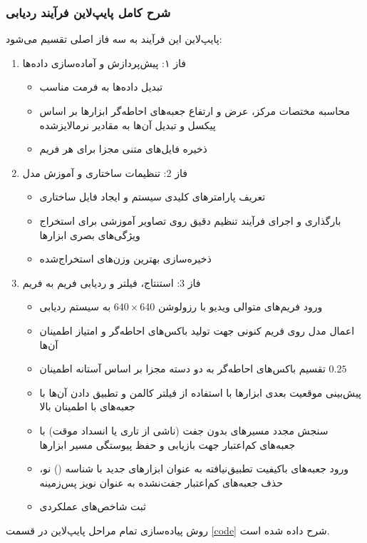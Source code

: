 \documentclass{article}
\begin{document}
\subsubsection{شرح کامل پایپ‌لاین فرآیند ردیابی}
پایپ‌لاین این فرآیند به سه فاز اصلی تقسیم می‌شود:
\begin{enumerate}
	\item فاز ۱: پیش‌پردازش و آماده‌سازی داده‌ها
	\begin{itemize}
		\item تبدیل داده‌ها به فرمت مناسب
		\item محاسبه مختصات مرکز، عرض و ارتفاع جعبه‌های احاطه‌گر ابزارها بر اساس پیکسل و تبدیل آن‌ها به مقادیر نرمالایزشده
		\item ذخیره فایل‌های متنی مجزا برای هر فریم
	\end{itemize}
	
	\item فاز 2: تنظیمات ساختاری و آموزش مدل
	\begin{itemize}
		\item  تعریف پارامترهای کلیدی سیستم و ایجاد فایل‌ ساختاری
		\item بارگذاری  و اجرای فرآیند تنظیم دقیق روی تصاویر آموزشی برای استخراج ویژگی‌های بصری ابزارها
		\item ذخیره‌سازی بهترین وزن‌های استخراج‌شده
	\end{itemize}
	
	\item فاز 3: استنتاج، فیلتر و ردیابی فریم به فریم
	\begin{itemize}
		\item  ورود فریم‌های متوالی ویدیو با رزولوشن $640 \times 640$ به سیستم ردیابی
		\item اعمال مدل  روی فریم کنونی جهت تولید باکس‌های احاطه‌گر و امتیاز اطمینان آن‌ها
		\item تقسیم باکس‌های احاطه‌گر به دو دسته مجزا بر اساس آستانه اطمینان $0.25$  
		\item پیش‌بینی موقعیت بعدی ابزارها با استفاده از فیلتر کالمن و تطبیق دادن آن‌ها با جعبه‌های با اطمینان بالا
		\item سنجش مجدد مسیرهای بدون جفت (ناشی از تاری یا انسداد موقت) با جعبه‌های کم‌اعتبار جهت بازیابی و حفظ پیوستگی مسیر ابزارها
		\item ورود جعبه‌های باکیفیت تطبیق‌نیافته به عنوان ابزارهای جدید با شناسه () نو، حذف جعبه‌های کم‌اعتبار جفت‌نشده به عنوان نویز پس‌زمینه
		\item ثبت شاخص‌های عملکردی	
	\end{itemize}
\end{enumerate}
روش پیاده‌سازی تمام مراحل پایپ‌لاین در قسمت \ref{code} شرح داده شده است.
\end{document}
